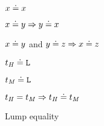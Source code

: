 \begin{figure}[p]
\centering

$x \doteq x$

$x \doteq y \Rightarrow y \doteq x$

$x \doteq y$ and $y \doteq z \Rightarrow x \doteq z$

$t_{\mathit{H}} \doteq \mathtt{L}$

$t_{\mathit{M}} \doteq \mathtt{L}$

$t_{\mathit{H}} = t_{\mathit{M}} \Rightarrow t_{\mathit{H}} \doteq t_{\mathit{M}}$

\caption{Lump equality}
\label{figequality}
\end{figure}